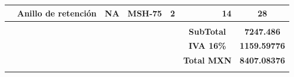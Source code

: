 \begin{landscape}
\begin{longtable}{|c|c|c|c|c|c|c|}
    \rowcolor[rgb]{ .867,  .922,  .969} \multicolumn{1}{|l|}{Colector} & \multicolumn{1}{l|}{\cellcolor[rgb]{ 0,  .69,  .314}Anillo de retención} & \multicolumn{1}{l|}{\cellcolor[rgb]{ 1,  1,  1}NA} & \multicolumn{1}{l|}{\cellcolor[rgb]{ 1,  1,  1}MSH-75} & \cellcolor[rgb]{ 1,  1,  1}2 & \multicolumn{1}{r|}{\cellcolor[rgb]{ 1,  1,  1}14} & \cellcolor[rgb]{ 1,  1,  1}28 \\
    \hline
          &       &       &       &       &       &  \\
    \hline
          &       &       &       &       & \textbf{SubTotal} & \textbf{7247.486} \\
    \hline
          &       &       &       &       & \textbf{IVA 16\%} & \textbf{1159.59776} \\
    \hline
          &       &       &       &       & \textbf{Total MXN} & \textbf{8407.08376} \\
    \hline
	
	\label{tabla:CostoFe}
\end{longtable}
\end{landscape}




